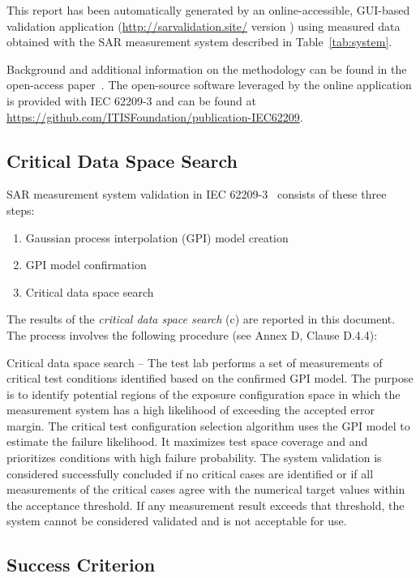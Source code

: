 \documentclass{article}
\begin{document}
This report has been automatically generated by an online-accessible, GUI-based validation application (\url{http://sarvalidation.site/} version ) using measured data obtained with the SAR measurement system described in Table~\ref{tab:system}.

Background and additional information on the methodology can be found in the open-access paper~\cite{gpi-paper}. The open-source software leveraged by the online application is provided with IEC 62209-3 and can be found at
\url{https://github.com/ITISFoundation/publication-IEC62209}.

\subsection{Critical Data Space Search}\label{sec:procedure}
SAR measurement system validation in IEC 62209-3~\cite{standard} consists of these three steps:

\begin{enumerate}[label=\alph*)]
\item Gaussian process interpolation (GPI) model creation
\item GPI model confirmation
\item Critical data space search
\end{enumerate}

The results of the \textit{critical data space search} (c) are reported in this document. The process involves the following procedure (see Annex D, Clause D.4.4):

Critical data space search -- The test lab performs a set of measurements of critical test conditions identified based on the confirmed GPI model. The purpose is to identify potential regions of the exposure configuration space in which the measurement system has a high likelihood of exceeding the accepted error margin. The critical test configuration selection algorithm uses the GPI model to estimate the failure likelihood. It  maximizes test space coverage and and prioritizes conditions with high failure probability. The system validation is considered successfully concluded if no critical cases are identified or if all measurements of the critical cases agree with the numerical target values within the acceptance threshold. If any measurement result exceeds that threshold, the system cannot be considered validated and is not acceptable for use.

\subsection{Success Criterion}\label{sec:quantities}
\end{document}
